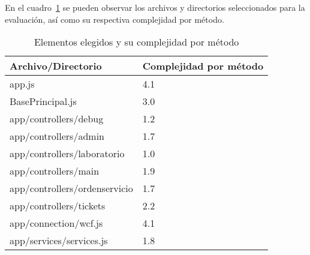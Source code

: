 En el cuadro~\ref{table:JSCC} se pueden observar los archivos y directorios 
seleccionados para la evaluación, así como su respectiva complejidad por método.
\begin{table}
  \small
\centering
    \begin{tabular}{|l|l|}
    \hline
    \textbf{Archivo/Directorio}            & \textbf{Complejidad por método} \\ \hline
    app.js                        & 4.1                    \\ \hline
    BasePrincipal.js              & 3.0                    \\ \hline
    app/controllers/debug         & 1.2                    \\ \hline
    app/controllers/admin         & 1.7                    \\ \hline
    app/controllers/laboratorio   & 1.0                    \\ \hline
    app/controllers/main          & 1.9                    \\ \hline
    app/controllers/ordenservicio & 1.7                    \\ \hline
    app/controllers/tickets       & 2.2                    \\ \hline
    app/connection/wcf.js         & 4.1                    \\ \hline
    app/services/services.js      & 1.8                    \\ \hline
    \end{tabular}
    \caption{Elementos elegidos y su complejidad por método}
    \label{table:JSCC}
\end{table}

